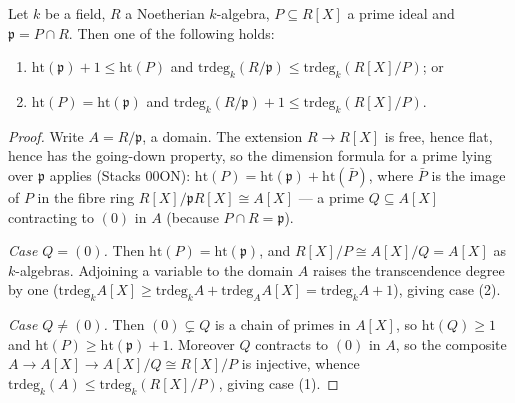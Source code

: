 \begin{lemma}
  \label{pa-lem:polynomial_step_height_trdeg}
  \leanok

  Let \(k\) be a field, \(R\) a Noetherian \(k\)-algebra, \(P \subseteq R[X]\) a prime
  ideal and \(\mathfrak p = P \cap R\). Then one of the following holds:
  \begin{enumerate}
    \item \(\mathrm{ht}(\mathfrak p) + 1 \leq \mathrm{ht}(P)\) and
      \(\mathrm{trdeg}_k(R/\mathfrak p) \leq \mathrm{trdeg}_k(R[X]/P)\); or
    \item \(\mathrm{ht}(P) = \mathrm{ht}(\mathfrak p)\) and
      \(\mathrm{trdeg}_k(R/\mathfrak p) + 1 \leq \mathrm{trdeg}_k(R[X]/P)\).
  \end{enumerate}
\end{lemma}
\begin{proof}
  \leanok
  Write \(A = R/\mathfrak p\), a domain. The extension \(R \to R[X]\) is free, hence
  flat, hence has the going-down property, so the dimension formula for a prime lying
  over \(\mathfrak p\) applies (Stacks 00ON):
  \(\mathrm{ht}(P) = \mathrm{ht}(\mathfrak p) + \mathrm{ht}(\bar P)\), where
  \(\bar P\) is the image of \(P\) in the fibre ring
  \(R[X]/\mathfrak p R[X] \cong A[X]\) --- a prime \(Q \subseteq A[X]\) contracting to
  \((0)\) in \(A\) (because \(P \cap R = \mathfrak p\)).

  \emph{Case \(Q = (0)\).} Then \(\mathrm{ht}(P) = \mathrm{ht}(\mathfrak p)\), and
  \(R[X]/P \cong A[X]/Q = A[X]\) as \(k\)-algebras. Adjoining a variable to the domain
  \(A\) raises the transcendence degree by one
  (\(\mathrm{trdeg}_k A[X] \geq \mathrm{trdeg}_k A + \mathrm{trdeg}_A A[X]
  = \mathrm{trdeg}_k A + 1\)), giving case (2).

  \emph{Case \(Q \neq (0)\).} Then \((0) \subsetneq Q\) is a chain of primes in
  \(A[X]\), so \(\mathrm{ht}(Q) \geq 1\) and
  \(\mathrm{ht}(P) \geq \mathrm{ht}(\mathfrak p) + 1\). Moreover \(Q\) contracts to
  \((0)\) in \(A\), so the composite \(A \to A[X] \to A[X]/Q \cong R[X]/P\) is
  injective, whence
  \(\mathrm{trdeg}_k(A) \leq \mathrm{trdeg}_k(R[X]/P)\), giving case (1).
\end{proof}

